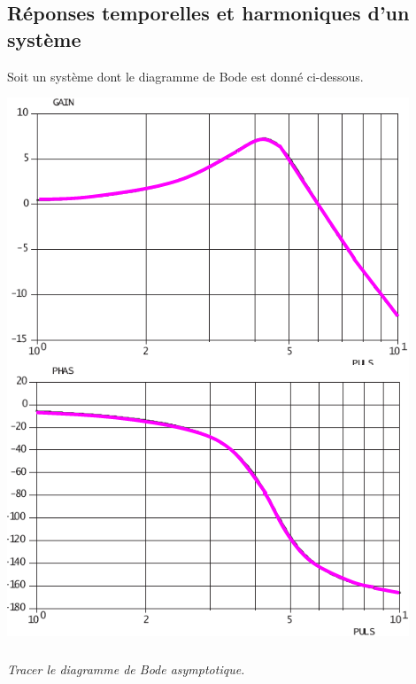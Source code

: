 \documentclass[10pt,fleqn]{article} %
\begin{document}

\vspace{6cm}
\pagestyle{fancy}
\thispagestyle{plain}

\def\columnseprulecolor{\color{ocre}}
\setlength{\columnseprule}{0.4pt} 


\ifprof
\else
\begin{multicols}{2}
\fi
\newpage

\section*{Réponses temporelles et harmoniques d'un système}

Soit un système dont le diagramme de Bode est donné ci-dessous.
\begin{center}
\includegraphics[width=\linewidth]{images/img_01}
\end{center}
\subparagraph{}
\textit{Tracer le diagramme de Bode asymptotique.}
\ifprof
\begin{corrige}


\end{corrige}
\end{multicols}
\end{document}
